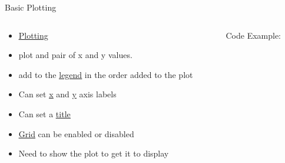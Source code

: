 % 
% 
% 
\begin{Slide}{Basic Plotting}
  \begin{columns}
    \begin{column}{.48\textwidth}
      
      \begin{itemize}

      \item  \underline{\href{https://matplotlib.org/stable/api/\_as\_gen/matplotlib.pyplot.plot.html}{Plotting}}
      \item plot and pair of x and y values.
      \item add to the \underline{\href{https://matplotlib.org/stable/api/_as_gen/matplotlib.pyplot.legend.html}{legend}} in the order added to the plot
      \item Can set \underline{\href{https://matplotlib.org/stable/api/_as_gen/matplotlib.pyplot.xlabel.html}{x}} and \underline{\href{https://matplotlib.org/stable/api/_as_gen/matplotlib.pyplot.ylabel.html}{y}} axis labels
      \item Can set a \underline{\href{https://matplotlib.org/stable/api/_as_gen/matplotlib.pyplot.title.html}{title}}
      \item \underline{\href{https://matplotlib.org/stable/api/_as_gen/matplotlib.pyplot.grid.html}{Grid}} can be enabled or disabled
      \item Need to show the plot to get it to display

      \end{itemize}
      
      
    \end{column}

    \hfill

    \begin{column}{.48\textwidth}
      Code Example:
      
    \inputminted[firstline=3,
      lastline=23,
      breaklines,
      fontsize=\tiny,
      bgcolor=Background,
      linenos]{python}{../src/plot1.py}
      
      
    \end{column}
  \end{columns}

\end{Slide}

